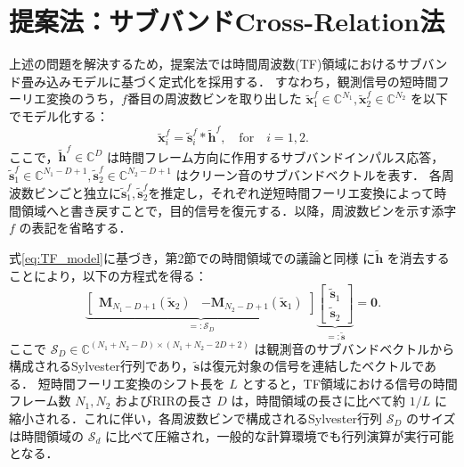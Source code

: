 \documentclass[10pt,twocolumn,dvipdfmx]{jarticle} %
\begin{document}
\section{提案法：サブバンドCross-Relation法}
上述の問題を解決するため，提案法では時間周波数(TF)領域におけるサブバンド畳み込みモデルに基づく定式化を採用する．
すなわち，観測信号の短時間フーリエ変換のうち，$f$番目の周波数ビンを取り出した $\tilde{\bm{x}}_1^f\in\mathbb{C}^{N_1}, \tilde{\bm{x}}_2^f\in\mathbb{C}^{N_2}$ を以下でモデル化する\cite{li2018ctf}：
\begin{equation}
    \tilde{\bm{x}}_i^f = \tilde{\bm{s}}_i^f \ast \tilde{\bm{h}}^f, \quad \text{for}\quad i=1,2. \label{eq:TF_model}
\end{equation}
ここで，$\tilde{\bm{h}}^f\in\mathbb{C}^D$ は時間フレーム方向に作用するサブバンドインパルス応答，$\tilde{\bm{s}}_1^f\in\mathbb{C}^{N_1-D+1}, \tilde{\bm{s}}_2^f\in\mathbb{C}^{N_2-D+1}$ はクリーン音のサブバンドベクトルを表す．
各周波数ビンごと独立に$\tilde{\bm{s}}_1^f,\tilde{\bm{s}}_2^f$を推定し，それぞれ逆短時間フーリエ変換によって時間領域へと書き戻すことで，目的信号を復元する．以降，周波数ビンを示す添字 $f$ の表記を省略する．

式\eqref{eq:TF_model}に基づき，第2節での時間領域での議論と同様%
に$\tilde{\bm{h}}$ を消去することにより，以下の方程式を得る：
\begin{equation}
    \underbrace{
        \begin{bmatrix} \mathbf{M}_{N_1-D+1}(\tilde{\bm{x}}_2) & -\mathbf{M}_{N_2-D+1}(\tilde{\bm{x}}_1) \end{bmatrix}
        }_{=:\bm{\mathcal{S}}_D}
        \underbrace{
    \begin{bmatrix}
    \tilde{\bm{s}}_1\\ \tilde{\bm{s}}_2
    \end{bmatrix}
        }_{=:\tilde{\bm{s}}}
    = \bm{0}. \label{eq:sylvester}
\end{equation}
ここで $\bm{\mathcal{S}}_D\in\mathbb{C}^{(N_1+N_2-D)\times (N_1+N_2-2D+2)}$ は観測音のサブバンドベクトルから構成されるSylvester行列であり，$\tilde{\bm{s}}$は復元対象の信号を連結したベクトルである．
短時間フーリエ変換のシフト長を $L$ とすると，TF領域における信号の時間フレーム数 $N_1,N_2$ およびRIRの長さ $D$ は，時間領域の長さに比べて約 $1/L$ に縮小される．これに伴い，各周波数ビンで構成されるSylvester行列 $\bm{\mathcal{S}}_D$ のサイズは時間領域の $\bm{\mathcal{S}}_d$ に比べて圧縮され，一般的な計算環境でも行列演算が実行可能となる．
\end{document}

